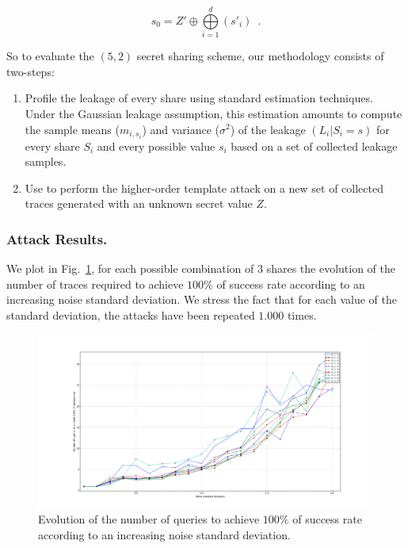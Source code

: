 \documentclass{llncs}
\begin{document}
\begin{equation*}
s_0= Z' \oplus \bigoplus\limits_{i=1}^{d} (s'_i) \enspace.
\end{equation*}

So to evaluate the $(5,2)$ secret sharing scheme, our methodology consists of two-steps:

\begin{enumerate}
\item Profile the leakage of every share using standard estimation techniques. Under the Gaussian leakage assumption, this estimation amounts to compute the sample means ($m_{i,s_i}$) and variance ($\sigma^2$) of the leakage $(L_i | S_i = s)$ for every share $S_i$ and every possible value $s_i$ based on a set of collected leakage samples.
\item Use \label{eq_pdf} to perform the higher-order template attack on a new set of collected traces generated with an unknown secret value $Z$.
\end{enumerate} 

\subsubsection{Attack Results.} 

We plot in Fig.~\ref{fig_3_shares}, for each possible combination of $3$ shares the evolution of the number of traces required to achieve $100\%$ of success rate according to an increasing noise standard deviation. We stress the fact that for each value of the standard deviation, the attacks have been repeated $1.000$ times.  

\begin{figure}
\begin{center}
\includegraphics[width=1\textwidth]{Figure/res_125_246_119_104_150.png}
\caption{Evolution of the number of queries to achieve $100\%$ of success rate according to an increasing noise standard deviation.}
\label{fig_3_shares}
\end{center}
\end{figure}
\end{document}

